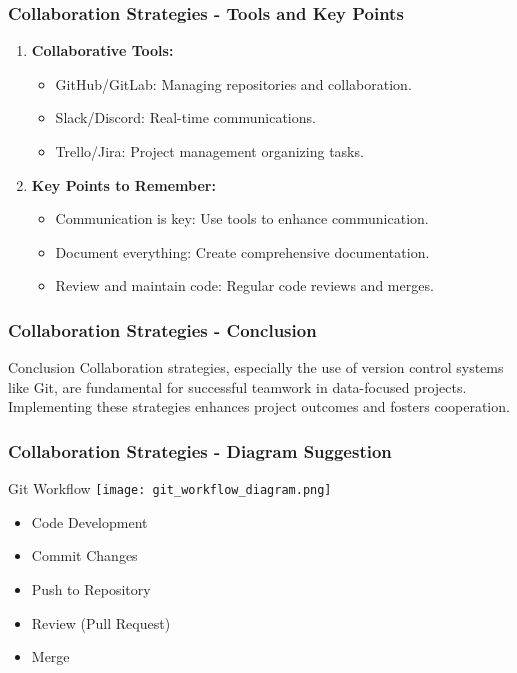 \documentclass[aspectratio=169]{beamer}
\begin{document}
\begin{frame}[fragile]
    \frametitle{Collaboration Strategies - Tools and Key Points}
    \begin{enumerate}
        \item \textbf{Collaborative Tools:}
            \begin{itemize}
                \item GitHub/GitLab: Managing repositories and collaboration.
                \item Slack/Discord: Real-time communications.
                \item Trello/Jira: Project management organizing tasks.
            \end{itemize}
        \item \textbf{Key Points to Remember:}
            \begin{itemize}
                \item Communication is key: Use tools to enhance communication.
                \item Document everything: Create comprehensive documentation.
                \item Review and maintain code: Regular code reviews and merges.
            \end{itemize}
    \end{enumerate}
\end{frame}

\begin{frame}[fragile]
    \frametitle{Collaboration Strategies - Conclusion}
    \begin{block}{Conclusion}
        Collaboration strategies, especially the use of version control systems like Git, are fundamental for successful teamwork in data-focused projects. Implementing these strategies enhances project outcomes and fosters cooperation.
    \end{block}
\end{frame}

\begin{frame}[fragile]
    \frametitle{Collaboration Strategies - Diagram Suggestion}
    \begin{block}{Git Workflow}
        \centering
        \texttt{[image: git\_workflow\_diagram.png]} %
        \begin{itemize}
            \item Code Development
            \item Commit Changes
            \item Push to Repository
            \item Review (Pull Request)
            \item Merge
        \end{itemize}
    \end{block}
\end{frame}
\end{document}
